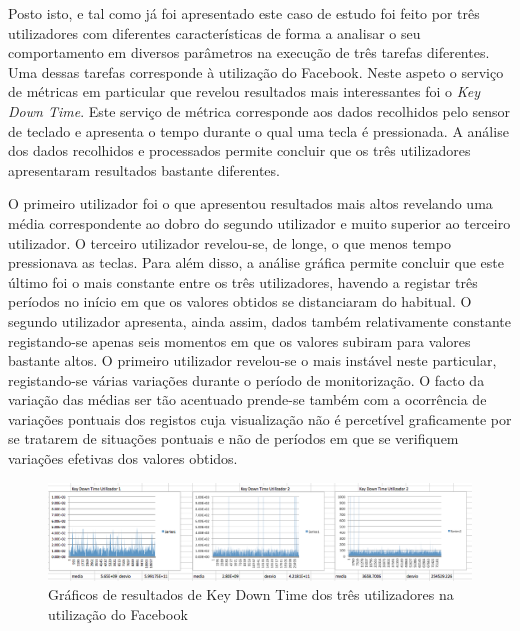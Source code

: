 Posto isto, e tal como já foi apresentado este caso de estudo foi feito por três utilizadores com diferentes características de forma a analisar o seu comportamento em diversos parâmetros na execução de três tarefas diferentes. Uma dessas tarefas corresponde à utilização do Facebook. Neste aspeto o serviço de métricas em particular que revelou resultados mais interessantes foi  o \textit{Key Down Time}. Este serviço de métrica corresponde aos dados recolhidos pelo sensor de teclado e apresenta o tempo durante o qual uma tecla é pressionada. A análise dos dados recolhidos e processados permite concluir que os três utilizadores apresentaram resultados bastante diferentes.

O primeiro utilizador foi o que apresentou resultados mais altos revelando uma média correspondente ao dobro do segundo utilizador e muito superior ao terceiro utilizador. O terceiro utilizador revelou-se, de longe, o que menos tempo pressionava as teclas. Para além disso, a análise gráfica permite concluir que este último foi o mais constante entre os três utilizadores, havendo a registar três períodos no início em que os valores obtidos se distanciaram do habitual. O segundo utilizador apresenta, ainda assim, dados também relativamente constante registando-se apenas seis momentos em que os valores subiram para valores bastante altos. O primeiro utilizador revelou-se o mais instável neste particular, registando-se várias variações durante o período de monitorização. O facto da variação das médias ser tão acentuado prende-se também com a ocorrência de variações pontuais dos registos cuja visualização não é percetível graficamente por se tratarem de situações pontuais e não de períodos em que se verifiquem variações efetivas dos valores obtidos.

\begin{figure}[htb]
   \centering
   \includegraphics[scale=0.3]{Images/keydowntime.png}
   \caption{Gráficos de resultados de Key Down Time dos três utilizadores na utilização do Facebook}
\end{figure}

